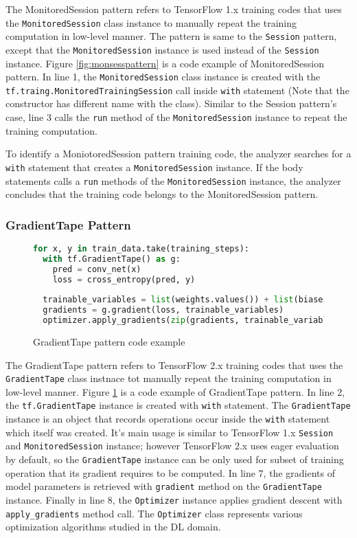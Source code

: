 The MonitoredSession pattern refers to TensorFlow 1.x training codes that
uses the {\tt MonitoredSession} class instance to manually repeat
the training computation in low-level manner.
The pattern is same to the {\tt Session} pattern, except that the
{\tt MonitoredSession} instance is used instead of the {\tt Session} instance.
Figure \ref{fig:monsesspattern} is a code example of MonitoredSession pattern.
In line 1, the {\tt MonitoredSession} class instance is created with
the {\tt tf.traing.MonitoredTrainingSession} call inside {\tt with} statement
(Note that the constructor has different name with the class).
Similar to the Session pattern's case, line 3 calls the {\tt run} method of the
{\tt MonitoredSession} instance to repeat the training computation.

To identify a MoniotoredSession pattern training code,
the analyzer searches for a {\tt with} statement that creates a
{\tt MonitoredSession} instance.
If the body statements calls a {\tt run} methods of the {\tt MonitoredSession}
instance, the analyzer concludes that the training code belongs to the
MonitoredSession pattern.


\subsubsection{GradientTape Pattern}

\begin{figure}[!ht]
  \begin{lstlisting}[language=Python]
for x, y in train_data.take(training_steps):
  with tf.GradientTape() as g:
    pred = conv_net(x)
    loss = cross_entropy(pred, y)
    
  trainable_variables = list(weights.values()) + list(biases.values())
  gradients = g.gradient(loss, trainable_variables)
  optimizer.apply_gradients(zip(gradients, trainable_variables))
  \end{lstlisting}
  \caption{GradientTape pattern code example}
  \label{fig:tapepattern}
\end{figure}



The GradientTape pattern refers to TensorFlow 2.x training codes that
uses the {\tt GradientTape} class instnace tot manually repeat the 
training computation in low-level manner.
Figure \ref{fig:tapepattern} is a code example of GradientTape pattern.
In line 2, the {\tt tf.GradientTape} instance is created with
{\tt with} statement.
The {\tt GradientTape} instance is an object that records operations
occur inside the {\tt with} statement which itself was created. 
It's main usage is similar to TensorFlow 1.x {\tt Session} and
{\tt MonitoredSession} instance; however TensorFlow 2.x uses eager evaluation
by default, so the {\tt GradientTape} instance can be only used for
subset of training operation that its gradient requires to be computed.
In line 7, the gradients of model parameters is retrieved with
{\tt gradient} method on the {\tt GradientTape} instance.
Finally in line 8, the {\tt Optimizer} instance applies gradient descent with
{\tt apply\_gradients} method call.
The {\tt Optimizer} class represents various optimization algorithms studied in 
the DL domain.

